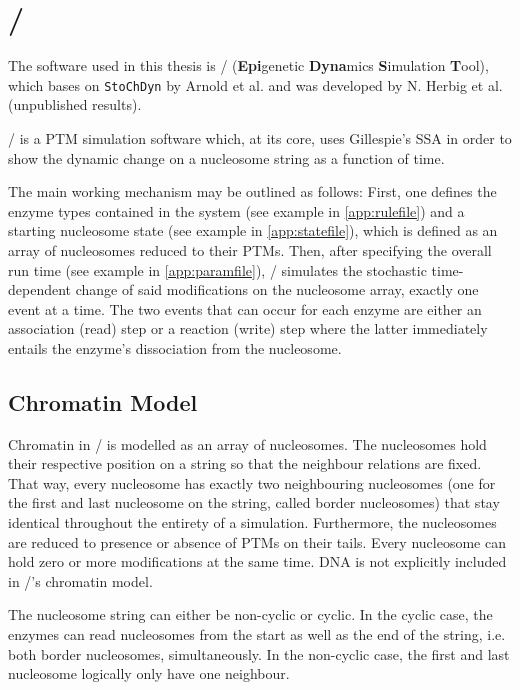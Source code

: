     \section{\ed/}
    \label{subsec:EpiDynast}
        The software used in this thesis is \ed/ (\textbf{Epi}genetic \textbf{Dyna}mics \textbf{S}imulation \textbf{T}ool), which bases on \texttt{StoChDyn} by Arnold et al. \cite{arnold2013chromatin} and was developed by N. Herbig et al. (unpublished results).

        \ed/ is a PTM simulation software which, at its core, uses Gillespie's SSA in order to show the dynamic change on a nucleosome string as a function of time.

        The main working mechanism may be outlined as follows: First, one defines the enzyme types contained in the system (see example in \ref{app:rulefile}) and a starting nucleosome state (see example in \ref{app:statefile}), which is defined as an array of nucleosomes reduced to their PTMs. Then, after specifying the overall run time (see example in \ref{app:paramfile}), \ed/ simulates the stochastic time-dependent change of said modifications on the nucleosome array, exactly one event at a time. The two events that can occur for each enzyme are either an association (read) step or a reaction (write) step where the latter immediately entails the enzyme's dissociation from the nucleosome.

        \subsection{Chromatin Model}
        \label{subsec:ChromatinModel}
            Chromatin in \ed/ is modelled as an array of nucleosomes. The nucleosomes hold their respective position on a string so that the neighbour relations are fixed. That way, every nucleosome has exactly two neighbouring nucleosomes (one for  the first and last nucleosome on the string, called border nucleosomes) that stay identical throughout the entirety of a simulation. Furthermore, the nucleosomes are reduced to presence or absence of PTMs on their tails. Every nucleosome can hold zero or more modifications at the same time. DNA is not explicitly included in \ed/'s chromatin model.

            The nucleosome string can either be non-cyclic or cyclic. In the cyclic case, the enzymes can read nucleosomes from the start as well as the end of the string, i.e. both border nucleosomes, simultaneously. In the non-cyclic case, the first and last nucleosome logically only have one neighbour.

